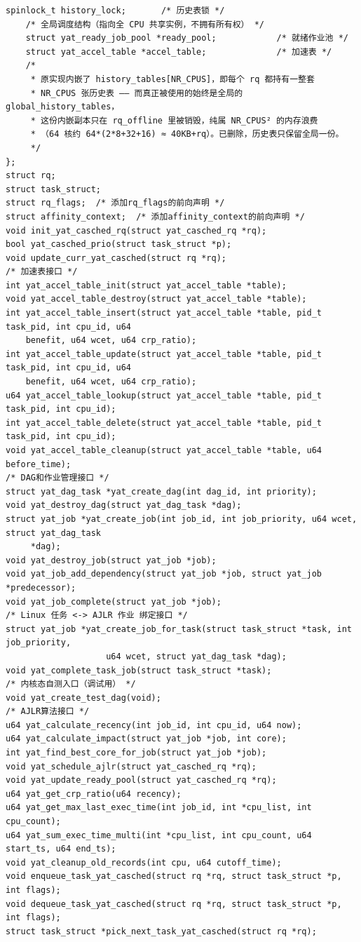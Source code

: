\documentclass[10pt,a4paper]{article}
\newenvironment{yatpage}{\vspace*{0pt}}{\par}
\begin{document}
\newpage
\begin{yatpage}
\begin{Verbatim}[fontsize=\fontsize{8.2}{9.8}\selectfont]
    spinlock_t history_lock;       /* 历史表锁 */
    /* 全局调度结构（指向全 CPU 共享实例，不拥有所有权） */
    struct yat_ready_job_pool *ready_pool;            /* 就绪作业池 */
    struct yat_accel_table *accel_table;              /* 加速表 */
    /*
     * 原实现内嵌了 history_tables[NR_CPUS]，即每个 rq 都持有一整套
     * NR_CPUS 张历史表 —— 而真正被使用的始终是全局的 global_history_tables，
     * 这份内嵌副本只在 rq_offline 里被销毁，纯属 NR_CPUS² 的内存浪费
     * （64 核约 64*(2*8+32+16) ≈ 40KB+rq）。已删除，历史表只保留全局一份。
     */
};
struct rq;
struct task_struct;
struct rq_flags;  /* 添加rq_flags的前向声明 */
struct affinity_context;  /* 添加affinity_context的前向声明 */
void init_yat_casched_rq(struct yat_casched_rq *rq);
bool yat_casched_prio(struct task_struct *p);
void update_curr_yat_casched(struct rq *rq);
/* 加速表接口 */
int yat_accel_table_init(struct yat_accel_table *table);
void yat_accel_table_destroy(struct yat_accel_table *table);
int yat_accel_table_insert(struct yat_accel_table *table, pid_t task_pid, int cpu_id, u64 
    benefit, u64 wcet, u64 crp_ratio);
int yat_accel_table_update(struct yat_accel_table *table, pid_t task_pid, int cpu_id, u64 
    benefit, u64 wcet, u64 crp_ratio);
u64 yat_accel_table_lookup(struct yat_accel_table *table, pid_t task_pid, int cpu_id);
int yat_accel_table_delete(struct yat_accel_table *table, pid_t task_pid, int cpu_id);
void yat_accel_table_cleanup(struct yat_accel_table *table, u64 before_time);
/* DAG和作业管理接口 */
struct yat_dag_task *yat_create_dag(int dag_id, int priority);
void yat_destroy_dag(struct yat_dag_task *dag);
struct yat_job *yat_create_job(int job_id, int job_priority, u64 wcet, struct yat_dag_task
     *dag);
void yat_destroy_job(struct yat_job *job);
void yat_job_add_dependency(struct yat_job *job, struct yat_job *predecessor);
void yat_job_complete(struct yat_job *job);
/* Linux 任务 <-> AJLR 作业 绑定接口 */
struct yat_job *yat_create_job_for_task(struct task_struct *task, int job_priority,
					u64 wcet, struct yat_dag_task *dag);
void yat_complete_task_job(struct task_struct *task);
/* 内核态自测入口（调试用） */
void yat_create_test_dag(void);
/* AJLR算法接口 */
u64 yat_calculate_recency(int job_id, int cpu_id, u64 now);
u64 yat_calculate_impact(struct yat_job *job, int core);
int yat_find_best_core_for_job(struct yat_job *job);
void yat_schedule_ajlr(struct yat_casched_rq *rq);
void yat_update_ready_pool(struct yat_casched_rq *rq);
u64 yat_get_crp_ratio(u64 recency);
u64 yat_get_max_last_exec_time(int job_id, int *cpu_list, int cpu_count);
u64 yat_sum_exec_time_multi(int *cpu_list, int cpu_count, u64 start_ts, u64 end_ts);
void yat_cleanup_old_records(int cpu, u64 cutoff_time);
void enqueue_task_yat_casched(struct rq *rq, struct task_struct *p, int flags);
void dequeue_task_yat_casched(struct rq *rq, struct task_struct *p, int flags);
struct task_struct *pick_next_task_yat_casched(struct rq *rq);
\end{Verbatim}
\end{yatpage}
\end{document}
